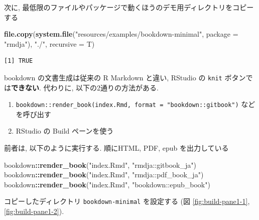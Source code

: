 \documentclass[
  nomag]{bxjsbook}
\newenvironment{Shaded}{\begin{snugshade}}{\end{snugshade}}
\newcommand{\DataTypeTok}[1]{\textcolor[rgb]{0.13,0.29,0.53}{#1}}
\newcommand{\KeywordTok}[1]{\textcolor[rgb]{0.13,0.29,0.53}{\textbf{#1}}}
\newcommand{\NormalTok}[1]{#1}
\newcommand{\OperatorTok}[1]{\textcolor[rgb]{0.81,0.36,0.00}{\textbf{#1}}}
\newcommand{\StringTok}[1]{\textcolor[rgb]{0.31,0.60,0.02}{#1}}
\providecommand{\tightlist}{%
  \setlength{\itemsep}{0pt}\setlength{\parskip}{0pt}}
\theoremstyle{definition}
\theoremstyle{definition}
\theoremstyle{definition}
\theoremstyle{remark}
\begin{document}
次に,
最低限のファイルやパッケージで動くほうのデモ用ディレクトリをコピーする

\begin{Shaded}
\begin{Highlighting}[numbers=left,,]
\KeywordTok{file.copy}\NormalTok{(}\KeywordTok{system.file}\NormalTok{(}\StringTok{"resources/examples/bookdown{-}minimal"}\NormalTok{, }\DataTypeTok{package =} \StringTok{"rmdja"}\NormalTok{), }\StringTok{"./"}\NormalTok{, }\DataTypeTok{recursive =}\NormalTok{ T)}
\end{Highlighting}
\end{Shaded}

\begin{verbatim}
[1] TRUE
\end{verbatim}

bookdown の文書生成は従来の R Markdown と違い, RStudio の \texttt{knit}
ボタンでは\textbf{できない}. 代わりに, 以下の2通りの方法がある.

\begin{enumerate}
\def\labelenumi{\arabic{enumi}.}
\tightlist
\item
  \texttt{bookdown::render\_book(\textquotesingle{}index.Rmd\textquotesingle{},\ format\ =\ "bookdown::gitbook")}
  などを呼び出す
\item
  RStudio の Build ペーンを使う
\end{enumerate}

前者は, 以下のように実行する. 順にHTML, PDF, epub を出力している

\begin{Shaded}
\begin{Highlighting}[numbers=left,,]
\NormalTok{bookdown}\OperatorTok{::}\KeywordTok{render\_book}\NormalTok{(}\StringTok{"index.Rmd"}\NormalTok{, }\StringTok{"rmdja::gitbook\_ja"}\NormalTok{)}
\NormalTok{bookdown}\OperatorTok{::}\KeywordTok{render\_book}\NormalTok{(}\StringTok{"index.Rmd"}\NormalTok{, }\StringTok{"rmdja::pdf\_book\_ja"}\NormalTok{)}
\NormalTok{bookdown}\OperatorTok{::}\KeywordTok{render\_book}\NormalTok{(}\StringTok{"index.Rmd"}\NormalTok{, }\StringTok{"bookdown::epub\_book"}\NormalTok{)}
\end{Highlighting}
\end{Shaded}

コピーしたディレクトリ \texttt{bookdown-minimal} を設定する (図
\ref{fig:build-pane1-1}, \ref{fig:build-pane1-2}).
\end{document}
